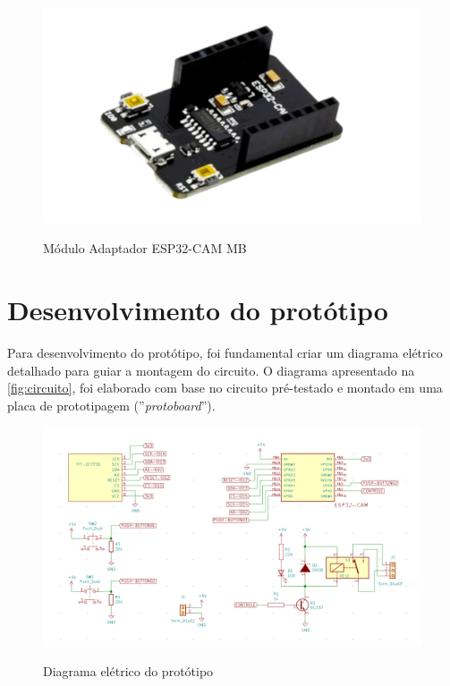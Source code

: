 \begin{figure}[h!]
    \centering
    \caption{Módulo Adaptador ESP32-CAM MB}
    \includegraphics[scale=0.25]{figuras/adaptador_esp32cam.png}
    \label{fig:adaptadoresp32}
    \centering
\end{figure}

\section{Desenvolvimento do protótipo}\label{sec:prototipo}

Para desenvolvimento do protótipo, foi fundamental criar um diagrama 
elétrico detalhado para guiar a montagem do circuito. O diagrama 
apresentado na \autoref{fig:circuito}, foi elaborado com base no 
circuito pré-testado e montado em uma placa de prototipagem (''\textit{protoboard}'').

\begin{figure}[h!]
    \centering
    \caption{Diagrama elétrico do protótipo}
    \includegraphics[scale=0.3]{figuras/circuito_completo.png}
    \fonte{}%
    \label{fig:circuito}
    \centering
\end{figure}


